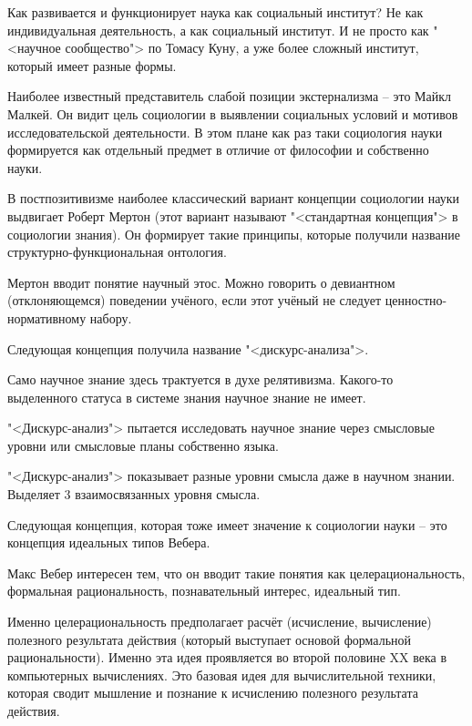 \documentclass[main.tex]{subfiles}
\begin{document}
Как развивается и функционирует наука как социальный институт?
Не как индивидуальная деятельность, а как социальный институт.
И не просто как "<научное сообщество"> по Томасу Куну, а уже более сложный институт, который имеет разные формы.

Наиболее известный представитель слабой позиции экстернализма -- это Майкл Малкей.
Он видит цель социологии в выявлении социальных условий и мотивов исследовательской деятельности.
В этом плане как раз таки социология науки формируется как отдельный предмет в отличие от философии и собственно науки.



В постпозитивизме наиболее классический вариант концепции социологии науки выдвигает Роберт Мертон (этот вариант называют "<стандартная концепция"> в социологии знания).
Он формирует такие принципы, которые получили название структурно-функциональная онтология.

Мертон вводит понятие научный этос.
Можно говорить о девиантном (отклоняющемся) поведении учёного, если этот учёный не следует ценностно-нормативному набору. 



Следующая концепция получила название "<дискурс-анализа">.

Само научное знание здесь трактуется в духе релятивизма.
Какого-то выделенного статуса в системе знания научное знание не имеет.

"<Дискурс-анализ"> пытается исследовать научное знание через смысловые уровни или смысловые планы собственно языка.

"<Дискурс-анализ"> показывает разные уровни смысла даже в научном знании.
Выделяет 3 взаимосвязанных уровня смысла.



Следующая концепция, которая тоже имеет значение к социологии науки -- это концепция идеальных типов Вебера.

Макс Вебер интересен тем, что он вводит такие понятия как целерациональность, формальная рациональность, познавательный интерес, идеальный тип.

Именно целерациональность предполагает расчёт (исчисление, вычисление) полезного результата действия (который выступает основой формальной рациональности).
Именно эта идея проявляется во второй половине XX века в компьютерных вычислениях.
Это базовая идея для вычислительной техники, которая сводит мышление и познание к исчислению полезного результата действия. 
\end{document}
